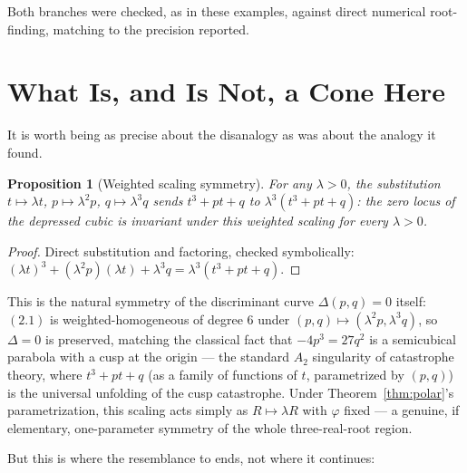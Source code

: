 \documentclass[11pt]{amsart}
\newtheorem{proposition}[theorem]{Proposition}
\theoremstyle{remark}
\begin{document}
Both branches were checked, as in these examples, against direct numerical root-finding, matching to the precision reported.

\section{What Is, and Is Not, a Cone Here}

It is worth being as precise about the disanalogy as \cite{Ebert2026EigenCoord} was about the analogy it found.

\begin{proposition}[Weighted scaling symmetry]\label{prop:scaling}
For any $\lambda>0$, the substitution $t\mapsto\lambda t$, $p\mapsto\lambda^2p$, $q\mapsto\lambda^3q$ sends $t^3+pt+q$ to $\lambda^3(t^3+pt+q)$: the zero locus of the depressed cubic is invariant under this weighted scaling for every $\lambda>0$.
\end{proposition}

\begin{proof}
Direct substitution and factoring, checked symbolically: $(\lambda t)^3+(\lambda^2p)(\lambda t)+\lambda^3q=\lambda^3(t^3+pt+q)$.
\end{proof}

This is the natural symmetry of the discriminant curve $\Delta(p,q)=0$ itself: $(2.1)$ is weighted-homogeneous of degree $6$ under $(p,q)\mapsto(\lambda^2p,\lambda^3q)$, so $\Delta=0$ is preserved, matching the classical fact that $-4p^3=27q^2$ is a semicubical parabola with a cusp at the origin --- the standard $A_2$ singularity of catastrophe theory, where $t^3+pt+q$ (as a family of functions of $t$, parametrized by $(p,q)$) is the universal unfolding of the cusp catastrophe. Under Theorem~\ref{thm:polar}'s parametrization, this scaling acts simply as $R\mapsto\lambda R$ with $\varphi$ fixed --- a genuine, if elementary, one-parameter symmetry of the whole three-real-root region.

But this is where the resemblance to \cite{Ebert2026EigenCoord} ends, not where it continues:
\end{document}
